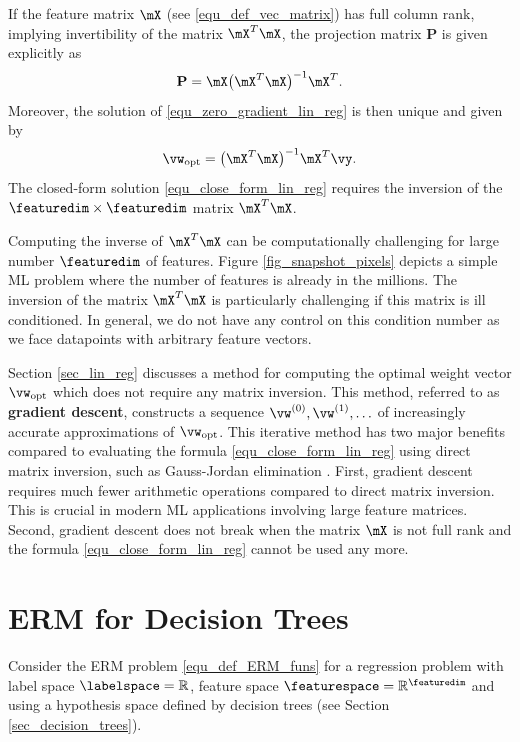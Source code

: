 \documentclass[12pt]{report}
\begin{document}
If the feature matrix $\mX$ (see \eqref{equ_def_vec_matrix}) has full column rank, implying invertibility of the matrix $\mX^{T} \mX$, 
the projection matrix $\mathbf{P}$ is given explicitly as 
\begin{equation} 
\nonumber
\mathbf{P} = \mX \big( \mX^{T} \mX \big)^{-1} \mX^{T}. 
\end{equation} 
Moreover, the solution of \eqref{equ_zero_gradient_lin_reg} is then unique and given by 
\begin{equation}
\label{equ_close_form_lin_reg}
\vw_{\rm opt} = \big(  \mX^{T} \mX \big)^{-1} \mX^{T} \vy. 
\end{equation}
The closed-form solution \eqref{equ_close_form_lin_reg} requires 
the inversion of the $\featuredim \times \featuredim$ matrix $\mX^{T} \mX$. 

Computing the inverse of $\mX^{T} \mX$ can be computationally challenging 
for large number $\featuredim$ of features. Figure \ref{fig_snapshot_pixels} 
depicts a simple ML problem where the number of features is already 
in the millions. The inversion of the matrix $\mX^{T} \mX$ is particularly 
challenging if this matrix is ill conditioned. In general, we do not have 
any control on this condition number as we face datapoints with arbitrary 
feature vectors. 

Section \ref{sec_lin_reg} discusses a method for computing the optimal weight vector 
$\vw_{\rm opt}$ which does not require any matrix inversion. This method, 
referred to as {\bf gradient descent}, constructs a sequence 
$\vw^{(0)}, \vw^{(1)},\ldots$ of increasingly accurate approximations 
of $\vw_{\rm opt}$. This iterative method has two major benefits 
compared to evaluating the formula \eqref{equ_close_form_lin_reg} using 
direct matrix inversion, such as Gauss-Jordan elimination \cite{golub96}. 
First, gradient descent requires much fewer arithmetic operations compared 
to direct matrix inversion. This is crucial in modern ML applications involving 
large feature matrices. Second, gradient descent does not break when the 
matrix $\mX$ is not full rank and the formula \eqref{equ_close_form_lin_reg} 
cannot be used any more. 

\section{ERM for Decision Trees}
\label{sec_ERM_decision_tree}

Consider the ERM problem \eqref{equ_def_ERM_funs} for a regression 
problem with label space $\labelspace=\mathbb{R}$, feature space 
$\featurespace= \mathbb{R}^{\featuredim}$ and using a hypothesis 
space defined by decision trees (see Section \ref{sec_decision_trees}). 
\end{document}
